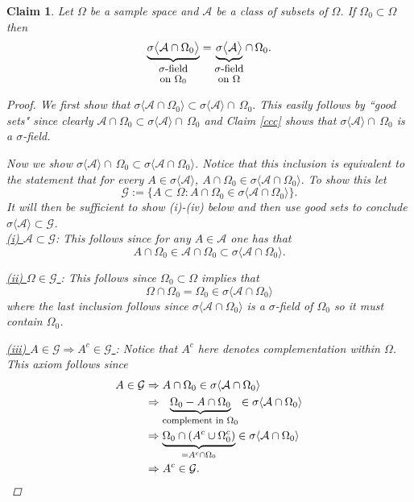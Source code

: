 \documentclass[10pt,letterpaper,twocolumn]{article}
\newtheorem{claim}{Claim}
\begin{document}
\begin{claim}
\label{restricTHM}
Let $\Omega$ be a sample space and  $\mathcal A$ be a class of subsets of $\Omega$.  If $\Omega_0\subset \Omega$ then
\[
\underbrace{\sigma\bigl\langle  \mathcal A \cap \Omega_0 \bigr\rangle}_{\shortstack{ \text{\small $\sigma$-field} \\ \text{\small on $\Omega_0$}}}= \underbrace{\sigma\bigl\langle \mathcal A \bigr\rangle}_{\shortstack{ \text{\small $\sigma$-field} \\ \text{\small on $\Omega$}}} \cap\, \Omega_0.
\]
\begin{proof}
We first show that $\sigma \langle  \mathcal A \cap \Omega_0 \rangle \subset \sigma \langle \mathcal A  \rangle \cap\, \Omega_0.$ This easily follows by ``good sets"  since clearly $\mathcal A\cap \Omega_0\subset \sigma\langle \mathcal A\rangle\cap \,\Omega_0$ and  Claim \ref{ccc} shows that $\sigma \langle \mathcal A  \rangle \cap\, \Omega_0$ is a $\sigma$-field.

Now we show  $\sigma\langle \mathcal A \rangle \cap\, \Omega_0 \subset \sigma \langle  \mathcal A \cap \Omega_0 \rangle $.  Notice that this inclusion is
equivalent to the statement that for every $A\in \sigma\langle\mathcal A\rangle$, $A\cap \Omega_0\in \sigma\langle\mathcal A\cap \Omega_0\rangle.$  To show this  let
\[ \mathcal G:=\{ A\subset \Omega: A\cap \Omega_0 \in \sigma\langle \mathcal A \cap \Omega_0 \rangle \}. \]
It will then be sufficient to show (i)-(iv) below and then use good sets to conclude $\sigma\langle\mathcal A \rangle\subset \mathcal G$.
\\
\noindent
\underline{(i)  $\mathcal A\subset \mathcal G$}: This follows since for any $A\in \mathcal A$ one has that
\[A\cap \Omega_0\in \mathcal A \cap \Omega_0 \subset \sigma\langle \mathcal A \cap \Omega_0 \rangle.  \]

  \vspace{.2cm}
\noindent
\underline{(ii) $\Omega \in \mathcal G$ }: This follows since $\Omega_0\subset \Omega$ implies that
\[\Omega \cap \Omega_0 = \Omega_0 \in \sigma\langle \mathcal A\cap \Omega_0\rangle\]
where the last inclusion follows since $\sigma\langle \mathcal A\cap \Omega_0\rangle$ is a $\sigma$-field of $\Omega_0$ so it must contain $\Omega_0$.

  \vspace{.2cm}
\noindent
\underline{(iii) $A\in \mathcal G\Rightarrow A^c \in \mathcal G$ }: Notice that $A^c$ here denotes complementation within $\Omega$. This axiom follows since
\begin{align*}
A\in\mathcal G&\Rightarrow A\cap \Omega_0\in \sigma\langle \mathcal A\cap \Omega_0\rangle \\
&\Rightarrow \underbrace{\Omega_0-A\cap \Omega_0}_\text{\footnotesize complement in $\Omega_0$}\in \sigma\langle \mathcal A\cap \Omega_0\rangle \\
&\Rightarrow \underbrace{\Omega_0\cap (A^c\cup \Omega_0^c)}_{= A^c\cap\Omega_0}\in \sigma\langle \mathcal A\cap \Omega_0\rangle \\
&\Rightarrow A^c\in\mathcal G.
\end{align*}



\end{proof}
\end{claim}
\end{document}
